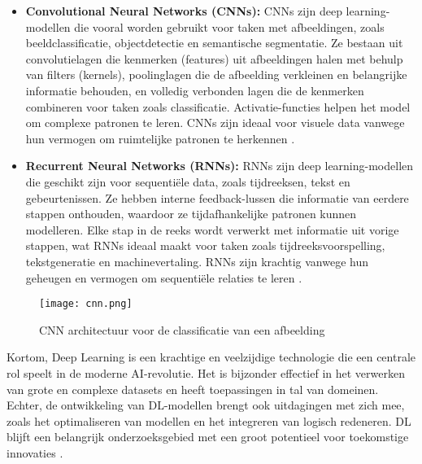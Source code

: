 \begin{itemize}
    \item \textbf{Convolutional Neural Networks (CNNs):} 
    CNNs zijn deep learning-modellen die vooral worden gebruikt voor taken met afbeeldingen, zoals beeldclassificatie, objectdetectie en semantische segmentatie. Ze bestaan uit convolutielagen die kenmerken (features) uit afbeeldingen halen met behulp van filters (kernels), poolinglagen die de afbeelding verkleinen en belangrijke informatie behouden, en volledig verbonden lagen die de kenmerken combineren voor taken zoals classificatie. Activatie-functies helpen het model om complexe patronen te leren. CNNs zijn ideaal voor visuele data vanwege hun vermogen om ruimtelijke patronen te herkennen \autocite{ZhaoEtAl2024}.

    \item \textbf{Recurrent Neural Networks (RNNs):} 
    RNNs zijn deep learning-modellen die geschikt zijn voor sequentiële data, zoals tijdreeksen, tekst en gebeurtenissen. Ze hebben interne feedback-lussen die informatie van eerdere stappen onthouden, waardoor ze tijdafhankelijke patronen kunnen modelleren. Elke stap in de reeks wordt verwerkt met informatie uit vorige stappen, wat RNNs ideaal maakt voor taken zoals tijdreeksvoorspelling, tekstgeneratie en machinevertaling. RNNs zijn krachtig vanwege hun geheugen en vermogen om sequentiële relaties te leren \autocite{JanieschEtAl2021}.
\end{itemize}

\begin{figure}
  \centering
  \texttt{[image: cnn.png]}
  \caption[Figuur 2]{\label{fig:cnn}CNN architectuur voor de classificatie van een afbeelding \autocite{ChaiEtAl2021}}
\end{figure}



Kortom, Deep Learning is een krachtige en veelzijdige technologie die een centrale rol speelt in de moderne AI-revolutie. 
Het is bijzonder effectief in het verwerken van grote en complexe datasets en heeft toepassingen in tal van domeinen. 
Echter, de ontwikkeling van DL-modellen brengt ook uitdagingen met zich mee, zoals het optimaliseren van modellen en het integreren van logisch redeneren. 
DL blijft een belangrijk onderzoeksgebied met een groot potentieel voor toekomstige innovaties \autocite{JiangEtAl2022}.

\subsection{}%
\label{subsec:computer-vision}

